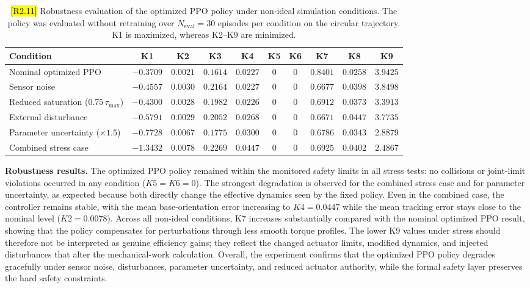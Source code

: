 \documentclass{ieeeaccess}
\newcommand{\hltwo}[1]{{\sethlcolor{rtwo}\hl{#1}}}
\newenvironment{rtwohl}
  {\def\FrameCommand{\colorbox{rtwo}}\MakeFramed{\advance\hsize-\width\FrameRestore}}
  {\endMakeFramed}
\begin{document}
\begin{table}[!t]
    \centering
    \caption{\hltwo{[R2.11]} Robustness evaluation of the optimized PPO policy under non-ideal simulation conditions.
    The policy was evaluated without retraining over $N_{\mathrm{eval}}=30$ episodes per condition on the circular
    trajectory. K1 is maximized, whereas K2--K9 are minimized.}
    \label{tab:robustness_eval}
    \small
    \renewcommand{\arraystretch}{1.15}
    \setlength{\tabcolsep}{3pt}
    \begin{tabular}{lccccccccc}
        \toprule
        \textbf{Condition} & \textbf{K1} & \textbf{K2} & \textbf{K3} & \textbf{K4} & \textbf{K5} & \textbf{K6} & \textbf{K7} & \textbf{K8} & \textbf{K9} \\
        \midrule
        Nominal optimized PPO & $-0.3709$ & $0.0021$ & $0.1614$ & $0.0227$ & $0$ & $0$ & $0.8401$ & $0.0258$ & $3.9425$ \\
        Sensor noise & $-0.4557$ & $0.0030$ & $0.2164$ & $0.0227$ & $0$ & $0$ & $0.6677$ & $0.0398$ & $3.8498$ \\
        Reduced saturation ($0.75\,\tau_{\max}$) & $-0.4300$ & $0.0028$ & $0.1982$ & $0.0226$ & $0$ & $0$ & $0.6912$ & $0.0373$ & $3.3913$ \\
        External disturbance & $-0.5791$ & $0.0029$ & $0.2052$ & $0.0268$ & $0$ & $0$ & $0.6671$ & $0.0447$ & $3.7735$ \\
        Parameter uncertainty ($\times 1.5$) & $-0.7728$ & $0.0067$ & $0.1775$ & $0.0300$ & $0$ & $0$ & $0.6786$ & $0.0343$ & $2.8879$ \\
        Combined stress case & $-1.3432$ & $0.0078$ & $0.2269$ & $0.0447$ & $0$ & $0$ & $0.6925$ & $0.0402$ & $2.4867$ \\
        \bottomrule
    \end{tabular}
\end{table}

\begin{rtwohl}
\noindent\textbf{Robustness results.} The optimized PPO policy remained within the monitored safety limits in all stress tests: no collisions
or joint-limit violations occurred in any condition ($K5=K6=0$). The strongest degradation is observed for the
combined stress case and for parameter uncertainty, as expected because both directly change the effective dynamics
seen by the fixed policy. Even in the combined case, the controller remains stable, with the mean base-orientation
error increasing to $K4=0.0447$ while the mean tracking error stays close to the nominal level ($K2=0.0078$).
Across all non-ideal conditions, K7 increases substantially compared with the nominal optimized PPO result, showing
that the policy compensates for perturbations through less smooth torque profiles. The lower K9 values under stress
should therefore not be interpreted as genuine efficiency gains; they reflect the changed actuator limits, modified
dynamics, and injected disturbances that alter the mechanical-work calculation. Overall, the experiment confirms
that the optimized PPO policy degrades gracefully under sensor noise, disturbances, parameter uncertainty, and
reduced actuator authority, while the formal safety layer preserves the hard safety constraints.
\end{rtwohl}
\end{document}
